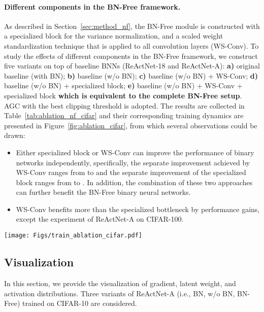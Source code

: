 \documentclass[final]{cvpr}
\begin{document}
\paragraph{Different components in the BN-Free framework.} As described in Section~\ref{sec:method_nf}, the BN-Free module is constructed with a specialized block for the variance normalization, and a scaled weight standardization technique that is applied to all convolution layers (WS-Conv). To study the effects of different components in the BN-Free framework, we construct five variants on top of baseline BNNs (ReActNet-18 and ReActNet-A): \textbf{a)} original baseline (with BN); \textbf{b)} baseline (w/o BN); \textbf{c)} baseline (w/o BN) + WS-Conv; \textbf{d)} baseline (w/o BN) + specialized block; \textbf{e)} baseline (w/o BN) + WS-Conv + specialized block \textbf{which is equivalent to the complete BN-Free setup}. AGC with the best clipping threshold is adopted. The results are collected in Table~\ref{tab:ablation_nf_cifar} and their corresponding training dynamics are presented in Figure~\ref{fig:ablation_cifar}, from which several observations could be drawn:
\begin{itemize}
    \item Either specialized block or WS-Conv can improve the performance of binary networks independently, specifically, the separate improvement achieved by WS-Conv ranges from  to  and the separate improvement of the specialized block ranges from  to . In addition, the combination of these two approaches can further benefit the BN-Free binary neural networks.
    \item WS-Conv benefits more than the specialized bottleneck by  performance gains, except the experiment of ReActNet-A on CIFAR-100.
\end{itemize}

\begin{figure*}[t]
    \centering
    \texttt{[image: Figs/train\_ablation\_cifar.pdf]}
    \caption{Results of testing accuracy over epochs on CIFAR-10/100 with ReActNet-18/A. The \textcolor{green}{green} background represents the first training step, in which only activations are binarized. And in the \textcolor{orange}{orange} part, both activations and weights are binary. }
    \label{fig:ablation_cifar}
    \vspace{-1mm}
\end{figure*}



\subsection{Visualization}
In this section, we provide the visualization of gradient, latent weight, and activation distributions. Three variants of ReActNet-A (i.e., BN, w/o BN, BN-Free) trained on CIFAR-10 are considered.
\end{document}
